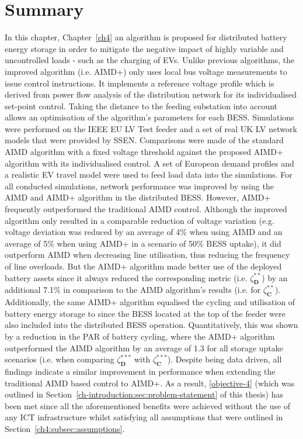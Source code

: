 \section{Summary}
\label{ch4:sec:summary}

In this chapter, Chapter~\ref{ch4} an algorithm is proposed for distributed battery energy storage in order to mitigate the negative impact of highly variable and uncontrolled loads - such as the charging of EVs.
Unlike previous algorithms, the improved algorithm (i.e. AIMD+) only uses local bus voltage measurements to issue control instructions.
It implements a reference voltage profile which is derived from power flow analysis of the distribution network for its individualised set-point control.
Taking the distance to the feeding substation into account allows an optimisation of the algorithm's parameters for each BESS.
Simulations were performed on the IEEE EU LV Test feeder and a set of real UK LV network models that were provided by SSEN.
Comparisons were made of the standard AIMD algorithm with a fixed voltage threshold against the proposed AIMD+ algorithm with its individualised control.
A set of European demand profiles and a realistic EV travel model were used to feed load data into the simulations.
For all conducted simulations, network performance was improved by using the AIMD and AIMD+ algorithm in the distributed BESS.
However, AIMD+ frequently outperformed the traditional AIMD control.
Although the improved algorithm only resulted in a comparable reduction of voltage variation (e.g. voltage deviation was reduced by an average of 4\% when using AIMD and an average of 5\% when using AIMD+ in a scenario of 50\% BESS uptake), it did outperform AIMD when decreasing line utilisation, thus reducing the frequency of line overloads.
But the AIMD+ algorithm made better use of the deployed battery assets since it always reduced the corresponding metric (i.e. $\zeta^{**}_\textbf{D}$) by an additional 7.1\% in comparison to the AIMD algorithm's results (i.e. for $\zeta^{**}_\textbf{C}$).
Additionally, the same AIMD+ algorithm equalised the cycling and utilisation of battery energy storage to since the BESS located at the top of the feeder were also included into the distributed BESS operation.
Quantitatively, this was shown by a reduction in the PAR of battery cycling, where the AIMD+ algorithm outperformed the AIMD algorithm by an average of 1.3 for all storage uptake scenarios (i.e. when comparing $\zeta^{***}_\textbf{D}$ with $\zeta^{***}_\textbf{C}$).
Despite being data driven, all findings indicate a similar improvement in performance when extending the traditional AIMD based control to AIMD+.
As a result, \ref{objective-4} (which was outlined in Section~\ref{ch-introduction:sec:problem-statement} of this thesis) has been met since all the aforementioned benefits were achieved without the use of any ICT infrastructure whilst satisfying all assumptions that were outlined in Section~\ref{ch4:subsec:assumptions}.
